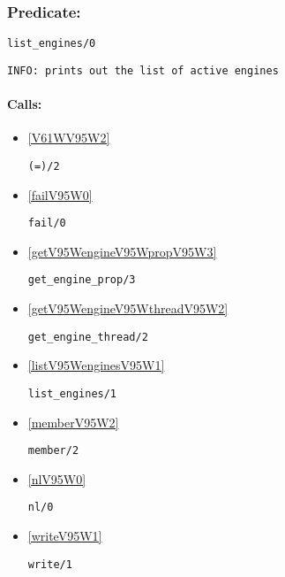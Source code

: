\subsubsection{Predicate:} \label{listV95WenginesV95W0}

\begin{verbatim}
list_engines/0
\end{verbatim}

{\small \begin{verbatim}
INFO: prints out the list of active engines

\end{verbatim}}
\paragraph{Calls:} 
\begin{itemize}
\item \ref{V61WV95W2} 
\begin{verbatim}
(=)/2
\end{verbatim}

\item \ref{failV95W0} 
\begin{verbatim}
fail/0
\end{verbatim}

\item \ref{getV95WengineV95WpropV95W3} 
\begin{verbatim}
get_engine_prop/3
\end{verbatim}

\item \ref{getV95WengineV95WthreadV95W2} 
\begin{verbatim}
get_engine_thread/2
\end{verbatim}

\item \ref{listV95WenginesV95W1} 
\begin{verbatim}
list_engines/1
\end{verbatim}

\item \ref{memberV95W2} 
\begin{verbatim}
member/2
\end{verbatim}

\item \ref{nlV95W0} 
\begin{verbatim}
nl/0
\end{verbatim}

\item \ref{writeV95W1} 
\begin{verbatim}
write/1
\end{verbatim}

\end{itemize}

